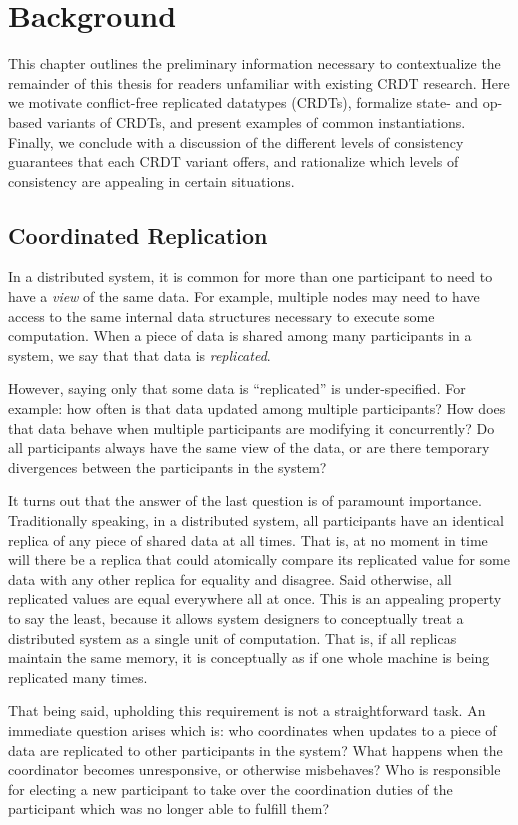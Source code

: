 \chapter{Background}
\label{chap:background}

This chapter outlines the preliminary information necessary to contextualize the
remainder of this thesis for readers unfamiliar with existing CRDT research.
Here we motivate conflict-free replicated datatypes (CRDTs), formalize state-
and op-based variants of CRDTs, and present examples of common instantiations.
Finally, we conclude with a discussion of the different levels of consistency
guarantees that each CRDT variant offers, and rationalize which levels of
consistency are appealing in certain situations.

\section{Coordinated Replication}
In a distributed system, it is common for more than one participant to need to
have a \textit{view} of the same data. For example, multiple nodes may need to
have access to the same internal data structures necessary to execute some
computation. When a piece of data is shared among many participants in a system,
we say that that data is \textit{replicated}.

However, saying only that some data is ``replicated'' is under-specified. For
example: how often is that data updated among multiple participants? How does
that data behave when multiple participants are modifying it concurrently? Do
all participants always have the same view of the data, or are there temporary
divergences between the participants in the system?

It turns out that the answer of the last question is of paramount importance.
Traditionally speaking, in a distributed system, all participants have an
identical replica of any piece of shared data at all times. That is, at no
moment in time will there be a replica that could atomically compare its
replicated value for some data with any other replica for equality and disagree.
Said otherwise, all replicated values are equal everywhere all at once. This is
an appealing property to say the least, because it allows system designers to
conceptually treat a distributed system as a single unit of computation. That
is, if all replicas maintain the same memory, it is conceptually as if one whole
machine is being replicated many times.

That being said, upholding this requirement is not a straightforward task. An
immediate question arises which is: who coordinates when updates to a piece of
data are replicated to other participants in the system? What happens when the
coordinator becomes unresponsive, or otherwise misbehaves? Who is responsible
for electing a new participant to take over the coordination duties of the
participant which was no longer able to fulfill them?

